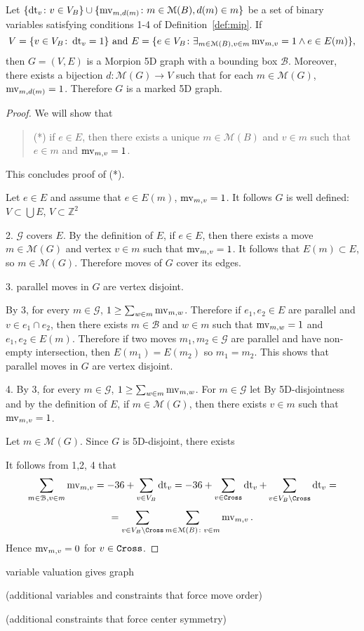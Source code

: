 \begin{lemma}
  Let 
$
  \{ \operatorname{dt}_v \colon v \in V_B \} \cup \{ \operatorname{mv}_{m, d(m)} \colon m \in \mathcal{M}(B), d(m) \in m \}
$
  be a set of binary variables satisfying conditions 1-4 of Definition~\ref{def:mip}.
If
 \[
    V = \{ v \in V_B \colon \operatorname{dt}_v = 1 \}
\text{ and }
    E = \{ e \in V_B \colon \exists_{m \in \mathcal{M}(B), v \in m} \operatorname{mv}_{m, v} = 1 \wedge e  \in E(m) \},
  \]
then $G = (V, E)$ is a Morpion 5D graph with a bounding box $\mathcal{B}$.
Moreover, there exists a bijection $d \colon \mathcal{M}(G) \to V$ such that for each $m \in \mathcal{M}(G)$,
$ \operatorname{mv}_{m, d(m)} = 1$.
Therefore $G$ is a marked 5D graph.
\end{lemma}
\begin{proof}
  We will show that
  \begin{quote}
  (*) if $e \in E$, then there exists a unique $m \in \mathcal{M}(B)$ and $v \in m$ such that $e \in m$ and
    $\operatorname{mv}_{m, v} = 1$. 
  \end{quote}
  This concludes proof of (*).
  
  Let $e \in E$ and assume that $e \in E(m)$, $\operatorname{mv}_{m, v} = 1$.
  It follows $G$ is well defined: $V \subset \bigcup E$, $V \subset \mathbb{Z}^2$
  
  
  2. $\mathcal{G}$ covers $E$.
  By the definition of $E$, if $e \in E$, then there exists a move $m \in \mathcal{M}(G)$ and vertex $v \in m$ such
  that $\operatorname{mv}_{m,v} = 1$. It follows that $E(m) \subset E$, so $m \in \mathcal{M}(G)$.
  Therefore moves of $G$ cover its edges.
  
  3. parallel moves in $G$ are vertex disjoint. 
  
  By 3, for every $m \in \mathcal{G}$, $1 \geq \sum_{w \in m} \operatorname{mv}_{m, w}$.
  Therefore if $e_1, e_2 \in E$ are parallel and $v \in e_1 \cap e_2$, 
    then there exists $m \in \mathcal{B}$ and $w \in m$ such that $\operatorname{mv}_{m,w} = 1$
      and $e_1, e_2 \in E(m)$.
   Therefore if two moves $m_1, m_2 \in \mathcal{G}$ are parallel and have non-empty intersection, then
     $E(m_1) = E(m_2)$ so $m_1 = m_2$.
   This shows that parallel moves in $G$ are vertex disjoint.
  
  4.   By 3, for every $m \in \mathcal{G}$, $1 \geq \sum_{w \in m} \operatorname{mv}_{m, w}$.
    For $m \in \mathcal{G}$ let 
      By 5D-disjointness and by the definition of $E$, 
        if $m \in \mathcal{M}(G)$, then there exists $v \in m$ such that $\operatorname{mv}_{m, v} = 1$.

   Let $m \in \mathcal{M}(G)$. Since $G$ is 5D-disjoint, there exists 
  
  It follows from 1,2, 4 that 
  \[
    \sum_{m \in \mathcal{B}, v \in m} \operatorname{mv}_{m, v} = -36  + \sum_{v \in V_B} \operatorname{dt}_v = -36 + \sum_{v \in \texttt{Cross}} \operatorname{dt}_v + \sum_{v \in V_B \setminus \texttt{Cross}} \operatorname{dt}_v =
    \]
    \[
      = \sum_{v \in V_B \setminus \texttt{Cross}} \sum_{m \in \mathcal{M}(B) \colon v \in m} \operatorname{mv}_{m, v}.
  \]
  Hence $\operatorname{mv}_{m,v} = 0$ for $v \in \texttt{Cross}$.
  
\end{proof}

\begin{lemma}
  variable valuation gives graph
\end{lemma}

(additional variables and constraints that force move order)

(additional constraints that force center symmetry)
